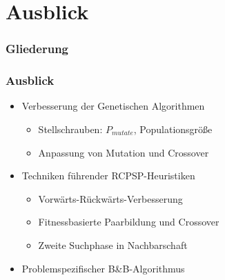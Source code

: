 \section{Ausblick}

\begin{frame}[noframenumbering]
\frametitle{Gliederung}
\end{frame}

\begin{frame}
\frametitle{Ausblick}
\begin{itemize}
\item Verbesserung der Genetischen Algorithmen
	\begin{itemize}
	\item Stellschrauben: $P_{mutate}$, Populationsgröße
	\item Anpassung von Mutation und Crossover\\[6mm]
	\end{itemize}
\item Techniken führender RCPSP-Heuristiken
	\begin{itemize}
	\item Vorwärts-Rückwärts-Verbesserung
	\item Fitnessbasierte Paarbildung und Crossover
	\item Zweite Suchphase in Nachbarschaft\\[6mm]
	\end{itemize}
\item Problemspezifischer B\&B-Algorithmus
\end{itemize}
\end{frame}




